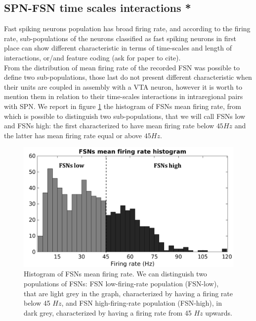 \subsection{SPN-FSN time scales interactions *}
\label{sec:SPN-FSN_Bin}
Fast spiking neurons population has broad firing rate, and according to the firing rate, sub-populations of the neurons classified as fast spiking neurons in first place can show different characteristic in terms of time-scales and length of interactions, or/and feature coding ({\color{red}ask for paper to cite}).\\From the distribution of mean firing rate of the recorded FSN was possible to define two sub-populations, those last do not present different characteristic when their units are coupled in assembly with a VTA neuron, however it is worth to mention them in relation to their time-scales interactions in intraregional pairs with SPN. We report in figure \ref{fig:FSNsFireHisto} the histogram of FSNs mean firing rate, from which is possible to distinguish two sub-populations, that we will call FSNs low and FSNs high: the first characterized to have mean firing rate below $45 Hz$ and the latter has mean firing rate equal or above $45 Hz$.\\
\begin{figure}
    \centering
    \includegraphics[scale=0.6]{figures/FSNFiringRateLightDark.pdf}
    \caption{Histogram of FSNs mean firing rate. We can distinguish two populations of FSNs: FSN low-firing-rate population (FSN-low), that are light grey in the graph, characterized by having a firing rate below 45 $Hz$, and FSN high-firing-rate population (FSN-high), in dark grey, characterized by having a firing rate from 45 $Hz$ upwards.}
    \label{fig:FSNsFireHisto}
\end{figure}
